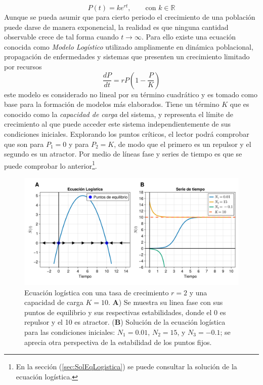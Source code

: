 $$P(t)=ke^{rt},\qquad\text{con }k\in\mathbb{R}$$
Aunque se pueda asumir que para cierto periodo el crecimiento de una población puede darse de manera exponencial, la realidad es que ninguna cantidad observable crece de tal forma cuando $t\to\infty$. Para ello existe una ecuación conocida como \textit{Modelo Logístico} utilizado ampliamente en dinámica poblacional, propagación de enfermedades y sistemas que presenten un crecimiento limitado por recursos
\begin{equation}\label{eqn:EqLogistica}
	\frac{dP}{dt}=rP\left (1-\frac{P}{K}\right )
\end{equation}
este modelo es considerado no lineal por su término cuadrático y es tomado como base para la formación de modelos más elaborados. Tiene un término $K$ que es conocido como la \textit{capacidad de carga} del sistema, y representa el límite de crecimiento al que puede acceder este sistema independientemente de sus condiciones iniciales. Explorando los puntos críticos, el lector podrá comprobar que son para $P_1=0$ y para $P_2=K$, de modo que el primero es un repulsor y el segundo es un atractor. Por medio de líneas fase y series de tiempo es que se puede comprobar lo anterior\footnote{En la sección (\ref{sec:SolEqLogistica}) se puede consultar la solución de la ecuación logística.}.
\begin{figure}[h!]
	\centering
	\includegraphics[scale=0.23]{../Imagenes/Ecuacion Logistica}
	\caption{Ecuación logística con una tasa de crecimiento $r=2$ y una capacidad de carga $K=10$. \textbf{A}) Se muestra su linea fase con sus puntos de equilibrio y sus respectivas estabilidades, donde el 0 es repulsor y el 10 es atractor. (\textbf{B}) Solución de la ecuación logística para las condiciones iniciales: $N_1=0.01$, $N_2=15$, y $N_3=-0.1$; se aprecia otra perspectiva de la estabilidad de los puntos fijos.}
	\label{fig:EcuacionLogistica}
\end{figure}		


